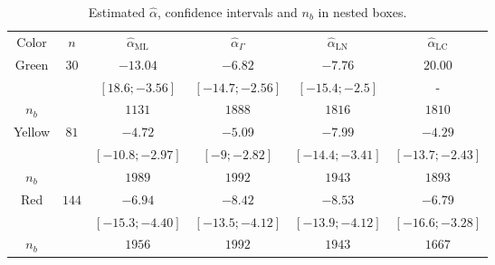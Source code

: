 \documentclass[twocolumn]{svjour3}
\begin{document}

\begin{table}[hbt]
	\centering
	\caption{Estimated $\widehat{\alpha}$, confidence intervals and $n_b$ in nested boxes.}\label{ResultadosCorner} 
	\begin{tabular}{c*5{c}}
		\toprule
		Color       &  $n$    &  $\widehat{\alpha}_{\text{{ML}}}$    &  $\widehat{\alpha}_{\Gamma}$  &  $\widehat{\alpha}_{\text{{LN}}}$ &  $\widehat{\alpha}_{\text{{LC}}}$\\
		\cmidrule(lr){1-6}
		Green       & $30$  & $-13.04$  & $-6.82$  & $-7.76$     &  $20.00$  \\
		&                   & $[18.6;-3.56]$ & $[-14.7;-2.56]$  & $[-15.4;-2.5]$ & -\\
		$n_{b}$    	&       &  $1131$         & $1888$            &  $1816$          &   $1810$       \\ \midrule
		Yellow     & $81$   & $-4.72$  & $-5.0$9   & $-7.99$     &  $-4.29$    \\
		&       & $[-10.8;-2.97]$ & $[-9;-2.82]$ & $[-14.4;-3.41]$ & $[-13.7;-2.43]$\\
		$n_{b}$    	&       & $1989$          &  $1992$         &   $1943$        &  $1893$        \\ \midrule
		Red        & $144$  & $-6.94$  & $-8.42$   & $-8.53$     &   $-6.79$\\
	            &           & $[-15.3;-4.40]$ & $[-13.5;-4.12]$ & $[-13.9;-4.12]$ & $[-16.6;-3.28]$\\
		$n_{b}$    	&       & $1956$          &  $1992$         &  $1943$         & $1667$         \\ \midrule
		\bottomrule
	\end{tabular}
\end{table} 
\end{document}
